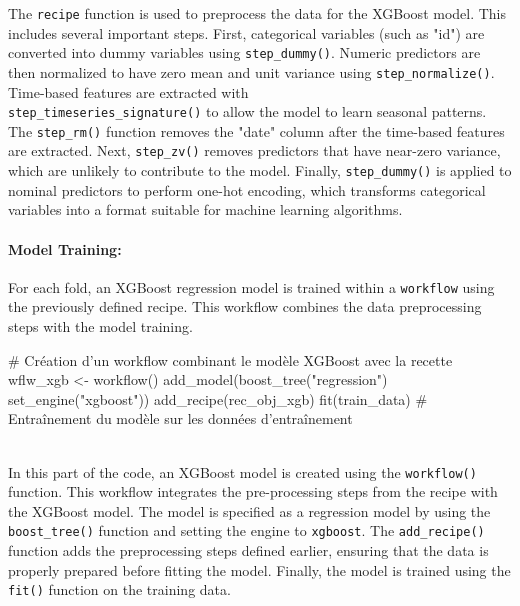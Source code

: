 \documentclass[12pt]{report}
\begin{document}
The \texttt{recipe} function is used to preprocess the data for the XGBoost model. This includes several important steps. First, categorical variables (such as "id") are converted into dummy variables using \texttt{step\_dummy()}. Numeric predictors are then normalized to have zero mean and unit variance using \texttt{step\_normalize()}. Time-based features are extracted with\\
\texttt{step\_timeseries\_signature()} to allow the model to learn seasonal patterns. The \texttt{step\_rm()} function removes the "date" column after the time-based features are extracted. Next, \texttt{step\_zv()} removes predictors that have near-zero variance, which are unlikely to contribute to the model. Finally, \texttt{step\_dummy()} is applied to nominal predictors to perform one-hot encoding, which transforms categorical variables into a format suitable for machine learning algorithms.\\

\paragraph{Model Training:}
For each fold, an XGBoost regression model is trained within a \texttt{workflow} using the previously defined recipe. This workflow combines the data preprocessing steps with the model training.\\

\begin{code}
# Création d’un workflow combinant le modèle XGBoost avec la recette
wflw_xgb <- workflow() %
  add_model(boost_tree("regression") %
  set_engine("xgboost")) %
  add_recipe(rec_obj_xgb) %
  fit(train_data)  # Entraînement du modèle sur les données d'entraînement
\end{code}\\

In this part of the code, an XGBoost model is created using the \texttt{workflow()} function. This workflow integrates the pre-processing steps from the recipe with the XGBoost model. The model is specified as a regression model by using the \texttt{boost\_tree()} function and setting the engine to \texttt{xgboost}. The \texttt{add\_recipe()} function adds the preprocessing steps defined earlier, ensuring that the data is properly prepared before fitting the model. Finally, the model is trained using the \texttt{fit()} function on the training data.
\end{document}
